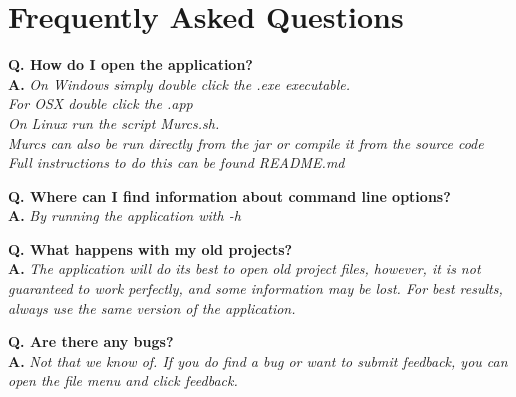 \section{Frequently Asked Questions}

\newcommand{\faqentry}[2]{\textbf{Q. #1}\\  \textbf{A.} \textit{#2}\vspace{0.5cm}}


\faqentry{How do I open the application?}{On Windows simply double click the .exe executable.\\
	For OSX double click the .app\\
	On Linux run the script Murcs.sh.\\
	Murcs can also be run directly from the jar or compile it from the source code\\
	Full instructions to  do this can be found README.md}

\faqentry{Where can I find information about command line options?}{By running the application with -h}

\faqentry{What happens with my old projects?}{The application will do its best to open old project files, however, it is not guaranteed to work perfectly, and some information may be lost. For best results, always use the same version of the application.}

\faqentry{Are there any bugs?}
{
Not that we know of.\newline
If you do find a bug or want to submit feedback, you can open the file menu and click feedback.
}